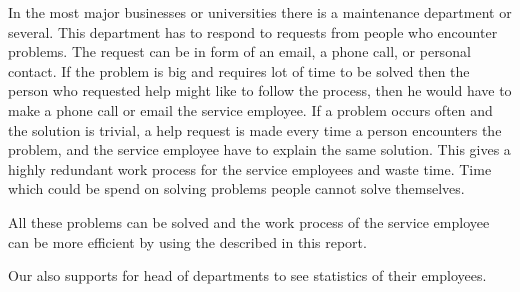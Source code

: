 In the most major businesses or universities there is a maintenance department or several. 
This department has to respond to requests from people who encounter problems. 
The request can be in form of an email, a phone call, or personal contact. 
If the problem is big and requires lot of time to be solved then the person who requested help might like to follow the process, then he would have to make a phone call or email the service employee. 
If a problem occurs often and the solution is trivial, a help request is made every time a person encounters the problem, and the service employee have to explain the same solution. 
This gives a highly redundant work process for the service employees and waste time. Time which could be spend on solving problems people cannot solve themselves. 

All these problems can be solved and the work process of the service employee can be more efficient by using the \hdesk[] described in this report. 
	
Our \hdesk[] also supports for head of departments to see statistics of their employees.